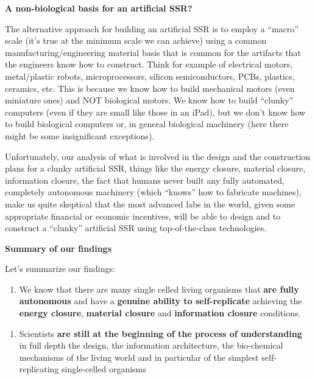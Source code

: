 \bigskip

\textbf{A non-biological basis for an artificial SSR?}


\bigskip

The alternative approach for building an artificial SSR is to employ a
“macro” scale (it’s true at the minimum scale we can achieve) using a
common manufacturing/engineering material basis that is common for the
artifacts that the engineers know how to construct. Think for example
of electrical motors, metal/plastic robots, microprocessors, silicon
semiconductors, PCBs, plastics, ceramics, etc. This is because we know
how to build mechanical motors (even miniature ones) and NOT biological
motors. We know how to build “clunky” computers (even if they are small
like those in an iPad), but we don’t know how to build biological
computers or, in general biological machinery (here there might be some
insignificant exceptions).


\bigskip

Unfortunately, our analysis of what is involved in  the design and the
construction plans for a clunky artificial SSR, things like the energy
closure, material closure, information closure, the fact that humans
never built any fully automated, completely autonomous machinery (which
“knows” how to fabricate machines), make us quite skeptical that the
most advanced labs in the world, given some appropriate financial or
economic incentives, will be able to design and to construct a “clunky”
 artificial SSR using top-of-the-class technologies.


\bigskip

\textbf{Summary of our findings}


\bigskip

Let’s summarize our findings:


\bigskip

\begin{enumerate}
\item We know that there are many single celled living organisms that
\textbf{are fully autonomous} and have a \textbf{genuine ability to
self-replicate} achieving the \textbf{energy closure}, \textbf{material
closure} and \textbf{information closure} conditions.
\end{enumerate}

\bigskip

\begin{enumerate}
\item Scientists \textbf{are still at the beginning of the process of
understanding} in full depth the design, the information architecture,
the bio-chemical mechanisms of the living world and in particular of
the simplest self-replicating single-celled organisms
\end{enumerate}


